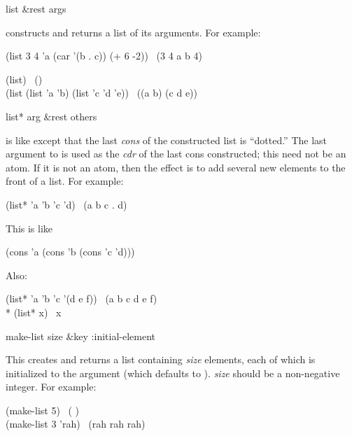 \begin{defun}[Function]
list &rest args

 constructs and returns a list of its arguments.
For example:
\begin{lisp}
(list 3 4 'a (car '(b . c)) (+ 6 -2)) \EV\ (3 4 a b 4)
\end{lisp}

\begin{lisp}
(list) \EV\ () \\
(list (list 'a 'b) (list 'c 'd 'e)) \EV\ ((a b) (c d e))
\end{lisp}
\end{defun}

\begin{defun}[Function]
list* arg &rest others

 is like  except that the last \emph{cons}
of the constructed list is ``dotted.''  The last argument to 
is used as the \emph{cdr} of the last cons constructed;
this need not be an atom.  If it is not an atom,
then the effect is to add several new elements to the front of a list.
For example:
\begin{lisp}
(list* 'a 'b 'c 'd) \EV\ (a b c . d)
\end{lisp}
This is like
\begin{lisp}
(cons 'a (cons 'b (cons 'c 'd)))
\end{lisp}
Also:
\begin{lisp}
(list* 'a 'b 'c '(d e f)) \EV\ (a b c d e f) \\*
(list* x) \EQ\ x
\end{lisp}
\end{defun}

\begin{defun}[Function]
make-list size &key :initial-element

This creates and returns a list containing \emph{size} elements, each
of which is initialized to the 
argument (which defaults to {\false}).
\emph{size} should be a non-negative integer.
For example:
\begin{lisp}
(make-list 5) \EV\ ({\false} {\false} {\false} {\false} {\false}) \\
(make-list 3  'rah) \EV\ (rah rah rah)
\end{lisp}
\end{defun}

